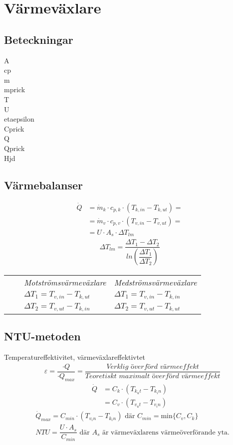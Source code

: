 \chapter{Värmeväxlare}
\section*{Beteckningar}

\acrfull{A} \\
\acrfull{cp} \\
\acrfull{m} \\
\acrfull{mprick} \\
\acrfull{T} \\
\acrfull{U} \\
\acrfull{etaepsilon} \\
\acrfull{Cprick} \\
\acrfull{Q} \\
\acrfull{Qprick} \\
\acrfull{Hjd}

\section*{Värmebalanser}
	\begin{align*}
		\dot{Q}&=\dot{m}_k\cdot c_{p,k}\cdot (T_{k,in}-T_{k,ut}) = \\
		       &=\dot{m}_v\cdot c_{p,v}\cdot (T_{v,in}-T_{v,ut}) = \\
		       &=U \cdot A_s \cdot \Delta T_{lm} 
	\end{align*}
	\begin{align*}
	\Delta T_{lm} = \dfrac{\Delta T_1 - \Delta T_2}{ln \left( \dfrac{\Delta T_1}{\Delta T_2}\right)}
	\end{align*}
	\begin{tabular}{l l l l}
    &&\textit{Motströmsvärmeväxlare} & \textit{Medströmsvärmeväxlare} \\
    &&$\Delta T_1 = T_{v,in} - T_{k,ut}$ & $\Delta T_1 = T_{v,in} - T_{k,in}$ \\
    &&$\Delta T_2 = T_{v,ut} - T_{k,in}$ & $\Delta T_2 = T_{v,ut} - T_{k,ut}$ \\
	\end{tabular}
	\section*{NTU-metoden}
	Temperatureffektivitet, värmeväxlareffektivtet
	\begin{align*}
		&\varepsilon = \dfrac{\cdot{Q}}{\cdot{Q}_{max}}=\dfrac{\textit{Verklig överförd värmeeffekt}}{\textit{Teoretiskt maximalt överförd värmeeffekt}}
	\end{align*}
	\begin{align*}
		\dot{Q}&=C_k \cdot (T_{k_ut} - T_{k_in}) \\
		       &=C_v \cdot (T_{v_ut} - T_{v_in})
	\end{align*}
	\begin{align*}
	&\dot{Q}_{max}=C_{min} \cdot (T_{v_in} - T_{k_in}) \text{ där } C_{min} = \text{min} \{C_v, C_k\} \\
	&\textit{NTU}=\dfrac{U \cdot A_s}{C_{min}} \text{ där } A_s \text{ är värmeväxlarens värmeöverförande yta.}
	\end{align*}
